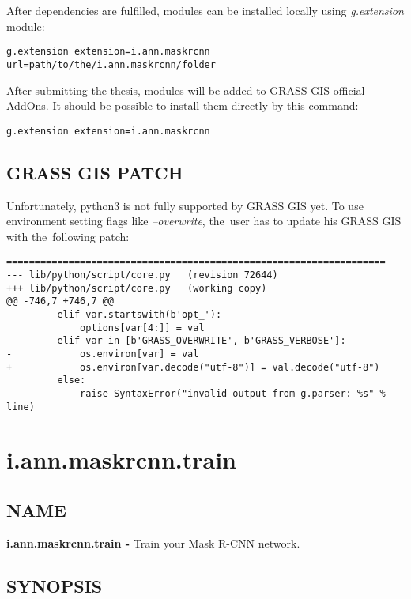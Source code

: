 After dependencies are fulfilled, modules can be installed locally using
\emph{g.extension} module:
{\footnotesize
\begin{lstlisting}[breaklines=true]
g.extension extension=i.ann.maskrcnn url=path/to/the/i.ann.maskrcnn/folder
\end{lstlisting}
}

After submitting the thesis, modules will be added to GRASS GIS official
AddOns. It should be possible to install them directly by this command:
{\footnotesize
\begin{lstlisting}
g.extension extension=i.ann.maskrcnn
\end{lstlisting}
}

\subsection*{GRASS GIS PATCH}

Unfortunately, python3 is not fully supported by GRASS GIS yet. To use
environment setting flags like \emph{--overwrite}, the~user has to update
his GRASS GIS with the~following patch:

{\footnotesize
\begin{lstlisting}[breaklines=true]
===================================================================
--- lib/python/script/core.py	(revision 72644)
+++ lib/python/script/core.py	(working copy)
@@ -746,7 +746,7 @@
         elif var.startswith(b'opt_'):
             options[var[4:]] = val
         elif var in [b'GRASS_OVERWRITE', b'GRASS_VERBOSE']:
-            os.environ[var] = val
+            os.environ[var.decode("utf-8")] = val.decode("utf-8")
         else:
             raise SyntaxError("invalid output from g.parser: %s" % line)
\end{lstlisting}
}

\clearpage

\section{i.ann.maskrcnn.train}
\label{appendix-train}

\subsection*{NAME}

\textbf{i.ann.maskrcnn.train -} Train your Mask R-CNN network.

\subsection*{SYNOPSIS}

